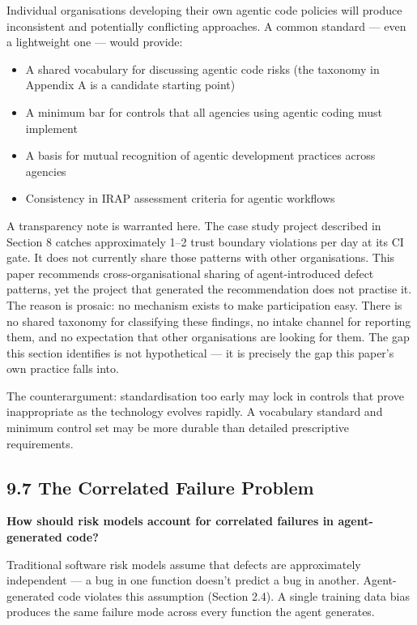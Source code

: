 \documentclass[a4paper,11pt]{report}
\providecommand{\tightlist}{%
  \setlength{\itemsep}{0pt}\setlength{\parskip}{0pt}}
\begin{document}
Individual organisations developing their own agentic code policies will
produce inconsistent and potentially conflicting approaches. A common
standard --- even a lightweight one --- would provide:

\begin{itemize}
\tightlist
\item
  A shared vocabulary for discussing agentic code risks (the taxonomy in
  Appendix A is a candidate starting point)
\item
  A minimum bar for controls that all agencies using agentic coding must
  implement
\item
  A basis for mutual recognition of agentic development practices across
  agencies
\item
  Consistency in IRAP assessment criteria for agentic workflows
\end{itemize}

A transparency note is warranted here. The case study project described
in Section 8 catches approximately 1--2 trust boundary violations per
day at its CI gate. It does not currently share those patterns with
other organisations. This paper recommends cross-organisational sharing
of agent-introduced defect patterns, yet the project that generated the
recommendation does not practise it. The reason is prosaic: no mechanism
exists to make participation easy. There is no shared taxonomy for
classifying these findings, no intake channel for reporting them, and no
expectation that other organisations are looking for them. The gap this
section identifies is not hypothetical --- it is precisely the gap this
paper's own practice falls into.

The counterargument: standardisation too early may lock in controls that
prove inappropriate as the technology evolves rapidly. A vocabulary
standard and minimum control set may be more durable than detailed
prescriptive requirements.

\hypertarget{the-correlated-failure-problem}{%
\subsection{9.7 The Correlated Failure
Problem}\label{the-correlated-failure-problem}}

\textbf{How should risk models account for correlated failures in
agent-generated code?}

Traditional software risk models assume that defects are approximately
independent --- a bug in one function doesn't predict a bug in another.
Agent-generated code violates this assumption (Section 2.4). A single
training data bias produces the same failure mode across every function
the agent generates.
\end{document}
